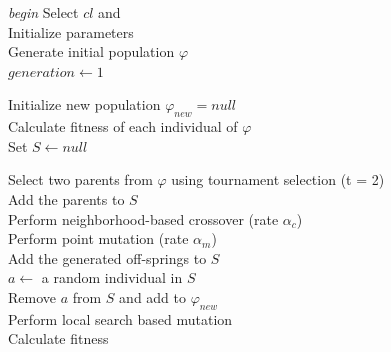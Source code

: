  
\begin{center}
\begin{algorithm}[!thb]
\BlankLine
\textit{begin{}}
\BlankLine
{}
{
	Select $cl$ and \Return\\
}
Initialize parameters\\
Generate initial population $\varphi$ \\
$generation \leftarrow 1$ \\
\BlankLine
{}
{
	Initialize new population $\varphi_{new}=null$ \\
	Calculate fitness of each individual of $\varphi$\\
	Set $S \leftarrow null$\\
	{
		Select two parents from $\varphi$ using tournament \qquad selection (t = 2) \\
		Add the parents to $S$\\
    	  Perform neighborhood-based crossover (rate $\alpha_c$)\\
		
		Perform point mutation (rate $\alpha_m$) \\
		Add the generated off-springs to $S$ \\

		$a \leftarrow$  a random individual in $S$ \\
		Remove $a$ from $S$ and add to $\varphi_{new}$ \\

		{
		   Perform local search based mutation \\
		   Calculate fitness \\	
		}

}}
\end{algorithm}
\end{center}
